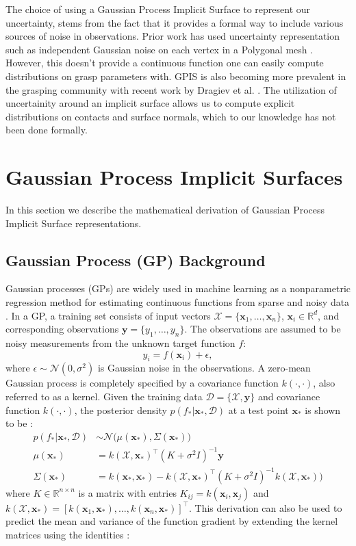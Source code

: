 \documentclass[letterpaper, 10 pt, conference]{ieeeconf}  %
\newcommand{\by}{\mathbf{y}}
\newcommand{\bx}{\mathbf{x}}
\newcommand{\mX}{\mathcal{X}}
\newcommand{\mD}{\mathcal{D}}
\newcommand{\mN}{\mathcal{N}}
\begin{document}
The choice of using a Gaussian Process Implicit Surface to represent our uncertainty, stems from the fact that it provides a formal way to include various sources of noise in observations. Prior work has used uncertainty representation such as independent Gaussian noise on each vertex in a Polygonal mesh \cite{kehoe2012toward}. However, this doesn't provide a continuous function one can easily compute distributions on grasp parameters with. GPIS is also becoming more prevalent in the grasping community with recent work by Dragiev et al. \cite{dragiev2011} . The utilization of uncertainity around an implicit surface allows us to compute explicit distributions on contacts and surface normals, which to our knowledge has not been done formally. 


\section{Gaussian Process Implicit Surfaces}

In this section we describe the mathematical derivation of Gaussian Process Implicit Surface representations.

\subsection{Gaussian Process (GP) Background}

Gaussian processes (GPs) are widely used in machine learning as a nonparametric regression method for estimating continuous functions from sparse and noisy data \cite{rasmussen2010gaussian}.
In a GP, a training set consists of input vectors $\mX = \{\bx_1, \ldots, \bx_n\}$, $\bx_i \in \mathbb{R}^d$, and corresponding observations $\by = \{y_1, \ldots, y_n\}$. The observations are assumed to be noisy measurements from the unknown target function $f$:
\begin{equation}
y_i = f(\bx_i) + \epsilon,
\end{equation}
where $\epsilon \sim \mN(0,\sigma^2)$ is Gaussian noise in the observations.
A zero-mean Gaussian process is completely specified by a covariance function $k(\cdot,\cdot)$, also referred to as a kernel.
Given the training data $\mD = \{\mX, \by\}$ and covariance function $k(\cdot,\cdot)$, the posterior density $p(f_*|\bx_*,\mD)$ at a test point $\bx_{*}$ is shown to be \cite{rasmussen2010gaussian}:
\begin{align}
	p(f_*|\bx_*,\mD) &\sim \mN\big(\mu(\bx_*), \Sigma(\bx_*)\big) \label{eq:GPposterior} \\
	\mu(\bx_*) &= k(\mX,\bx_*)^{\intercal}(K + \sigma^2I)^{-1}\by \label{eq:GPmean} \\
	\Sigma(\bx_*) &= k(\bx_*,\bx_*)-k(\mX,\bx_*)^{\intercal}(K+\sigma^2I)^{-1}k(\mX,\bx_*)\big) \label{eq:GPvar}
\end{align}
where $K \in \mathbb{R}^{n \times n}$ is a matrix with entries $K_{ij} = k(\bx_i,\bx_j)$ and $k(\mX,\bx_*) = [k(\bx_1,\bx_*),\ldots,k(\bx_n,\bx_*)]^{\intercal}$. 
This derivation can also be used to predict the mean and variance of the function gradient by extending the kernel matrices using the identities \cite{solak2003derivative}:
\end{document}
